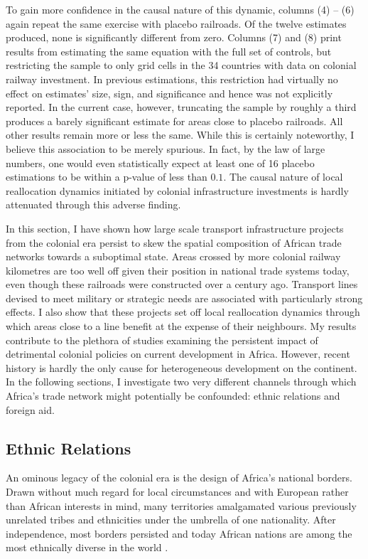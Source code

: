 \documentclass[11pt, oneside]{article}   	%
\begin{document}
To gain more confidence in the causal nature of this dynamic, columns (4) -- (6) again repeat the same exercise with placebo railroads. Of the twelve estimates produced, none is significantly different from zero. Columns (7) and (8) print results from estimating the same equation with the full set of controls, but restricting the sample to only grid cells in the 34 countries with data on colonial railway investment. In previous estimations, this restriction had virtually no effect on estimates' size, sign, and significance and hence was not explicitly reported. In the current case, however, truncating the sample by roughly a third produces a barely significant estimate for areas close to placebo railroads. All other results remain more or less the same. While this is certainly noteworthy, I believe this association to be merely spurious. In fact, by the law of large numbers, one would even statistically expect at least one of 16 placebo estimations to be within a p-value of less than $0.1$. The causal nature of local reallocation dynamics initiated by colonial infrastructure investments is hardly attenuated through this adverse finding.

In this section, I have shown how large scale transport infrastructure projects from the colonial era persist to skew the spatial composition of African trade networks towards a suboptimal state. Areas crossed by more colonial railway kilometres are too well off given their position in national trade systems today, even though these railroads were constructed over a century ago. Transport lines devised to meet military or strategic needs are associated with particularly strong effects. I also show that these projects set off local reallocation dynamics through which areas close to a line benefit at the expense of their neighbours. My results contribute to the plethora of studies examining the persistent impact of detrimental colonial policies on current development in Africa. However, recent history is hardly the only cause for heterogeneous development on the continent. In the following sections, I investigate two very different channels through which Africa's trade network might potentially be confounded: ethnic relations and foreign aid.

\subsection{Ethnic Relations}
An ominous legacy of the colonial era is the design of Africa's national borders. Drawn without much regard for local circumstances and with European rather than African interests in mind, many territories amalgamated various previously unrelated tribes and ethnicities under the umbrella of one nationality. After independence, most borders persisted and today African nations are among the most ethnically diverse in the world \citep{Alesina_Ethnicinequality_2016}.
\end{document}
